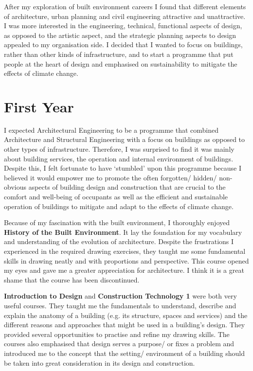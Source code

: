 After my exploration of built environment careers I found that different elements of architecture, urban planning and civil engineering attractive and unattractive.
I was more interested in the engineering, technical, functional aspects of design, as opposed to the artistic aspect, and the strategic planning aspects to design appealed to my organisation side.
I decided that I wanted to focus on buildings, rather than other kinds of infrastructure, and to start a programme that put people at the heart of design and emphasised on sustainability to mitigate the effects of climate change.



\section{First Year}

I expected Architectural Engineering to be a programme that combined Architecture and Structural Engineering with a focus on buildings as opposed to other types of infrastructure.
Therefore, I was surprised to find it was mainly about building services, the operation and internal environment of buildings.
Despite this, I felt fortunate to have `stumbled' upon this programme because I believed it would empower me to promote the often forgotten/ hidden/ non-obvious aspects of building design and construction that are crucial to the comfort and well-being of occupants as well as the efficient and sustainable operation of buildings to mitigate and adapt to the effects of climate change.

Because of my fascination with the built environment, I thoroughly enjoyed \textbf{History of the Built Environment}.
It lay the foundation for my vocabulary and understanding of the evolution of architecture.
Despite the frustrations I experienced in the required drawing exercises, they taught me some fundamental skills in drawing neatly and with proportions and perspective.
This course opened my eyes and gave me a greater appreciation for architecture.
I think it is a great shame that the course has been discontinued.

\textbf{Introduction to Design} and \textbf{Construction Technology 1} were both very useful courses.
They taught me the fundamentals to understand, describe and explain the anatomy of a building (e.g. its structure, spaces and services) and the different reasons and approaches that might be used in a building's design.
They provided several opportunities to practise and refine my drawing skills.
The courses also emphasised that design serves a purpose/ or fixes a problem and introduced me to the concept that the setting/ environment of a building should be taken into great consideration in its design and construction.

